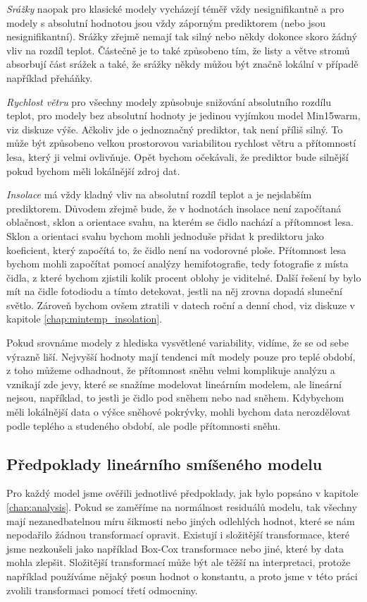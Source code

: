 \textit{Srážky} naopak pro klasické modely vycházejí téměř vždy nesignifikantně a pro modely s absolutní hodnotou jsou vždy záporným prediktorem (nebo jsou nesignifikantní). Srážky zřejmě nemají tak silný nebo někdy dokonce skoro žádný vliv na rozdíl teplot. Částečně je to také způsobeno tím, že listy a větve stromů absorbují část srážek a také, že srážky někdy můžou být značně lokální v případě například přeháňky.

\textit{Rychlost větru} pro všechny modely způsobuje snižování absolutního rozdílu teplot, pro modely bez absolutní hodnoty je jedinou vyjímkou model Min15warm, viz diskuze výše. Ačkoliv jde o jednoznačný prediktor, tak není příliš silný. To může být způsobeno velkou prostorovou variabilitou rychlost větru a přítomností lesa, který ji velmi ovlivňuje. Opět bychom očekávali, že prediktor bude silnější pokud bychom měli lokálnější zdroj dat.

\textit{Insolace} má vždy kladný vliv na absolutní rozdíl teplot a je nejslabším prediktorem. Důvodem zřejmě bude, že v hodnotách insolace není započítaná oblačnost, sklon a orientace svahu, na kterém se čidlo nachází a přítomnost lesa. Sklon a orientaci svahu bychom mohli jednoduše přidat k prediktoru jako koeficient, který započítá to, že čidlo není na vodorovné ploše. Přítomnost lesa bychom mohli započítat pomocí analýzy hemifotografie, tedy fotografie z místa čidla, z které bychom zjistili kolik procent oblohy je viditelné. Další řešení by bylo mít na čidle fotodiodu a tímto detekovat, jestli na něj zrovna dopadá sluneční světlo. Zároveň bychom ovšem ztratili v datech roční a denní chod, viz diskuze v kapitole \ref{chap:mintemp_insolation}.

Pokud srovnáme modely z hlediska vysvětlené variability, vidíme, že se od sebe výrazně liší. Nejvyšší hodnoty mají tendenci mít modely pouze pro teplé období, z toho můžeme odhadnout, že přítomnost sněhu velmi komplikuje analýzu a vznikají zde jevy, které se snažíme modelovat lineárním modelem, ale lineární nejsou, například, to jestli je čidlo pod sněhem nebo nad sněhem. Kdybychom měli lokálnější data o výšce sněhové pokrývky, mohli bychom data nerozdělovat podle teplého a studeného období, ale podle přítomnosti sněhu.

\subsection{Předpoklady lineárního smíšeného modelu}
Pro každý model jsme ověřili jednotlivé předpoklady, jak bylo popsáno v kapitole \ref{chap:analysis}. Pokud se zaměříme na normálnost residuálů modelu, tak všechny mají nezanedbatelnou míru šikmosti nebo jiných odlehlých hodnot, které se nám nepodařilo žádnou transformací opravit. Existují i složitější transformace, které jsme nezkoušeli jako například Box-Cox transformace nebo jiné, které by data mohla zlepšit. Složitější transformací může být ale těžší na interpretaci, protože například používáme nějaký posun hodnot o konstantu, a proto jsme v této práci zvolili transformaci pomocí třetí odmocniny. 

